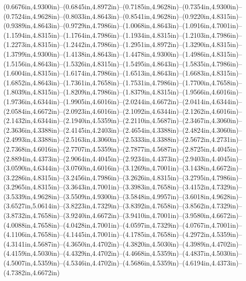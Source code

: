 (0.6676in,4.9300in)--(0.6845in,4.8972in)--(0.7185in,4.9628in)--(0.7354in,4.9300in)--(0.7524in,4.9628in)--(0.8033in,4.8643in)--(0.8541in,4.9628in)--(0.9220in,4.8315in)--(0.9389in,4.8643in)--(0.9729in,4.7986in)--(1.0068in,4.8643in)--(1.0916in,4.7001in)--(1.1594in,4.8315in)--(1.1764in,4.7986in)--(1.1934in,4.8315in)--(1.2103in,4.7986in)--(1.2273in,4.8315in)--(1.2442in,4.7986in)--(1.2951in,4.8972in)--(1.3290in,4.8315in)--(1.3799in,4.9300in)--(1.4138in,4.8643in)--(1.4478in,4.9300in)--(1.4986in,4.8315in)--(1.5156in,4.8643in)--(1.5326in,4.8315in)--(1.5495in,4.8643in)--(1.5835in,4.7986in)--(1.6004in,4.8315in)--(1.6174in,4.7986in)--(1.6513in,4.8643in)--(1.6683in,4.8315in)--(1.6852in,4.8643in)--(1.7361in,4.7658in)--(1.7531in,4.7986in)--(1.7700in,4.7658in)--(1.8039in,4.8315in)--(1.8209in,4.7986in)--(1.8379in,4.8315in)--(1.9566in,4.6016in)--(1.9736in,4.6344in)--(1.9905in,4.6016in)--(2.0244in,4.6672in)--(2.0414in,4.6344in)--(2.0584in,4.6672in)--(2.0923in,4.6016in)--(2.1092in,4.6344in)--(2.1262in,4.6016in)--(2.1432in,4.6344in)--(2.1940in,4.5359in)--(2.2110in,4.5687in)--(2.3467in,4.3060in)--(2.3636in,4.3388in)--(2.4145in,4.2403in)--(2.4654in,4.3388in)--(2.4824in,4.3060in)--(2.4993in,4.3388in)--(2.5163in,4.3060in)--(2.5333in,4.3388in)--(2.5672in,4.2731in)--(2.7368in,4.6016in)--(2.7707in,4.5359in)--(2.7877in,4.5687in)--(2.8725in,4.4045in)--(2.8894in,4.4373in)--(2.9064in,4.4045in)--(2.9234in,4.4373in)--(2.9403in,4.4045in)--(3.0590in,4.6344in)--(3.0760in,4.6016in)--(3.1269in,4.7001in)--(3.1438in,4.6672in)--(3.2286in,4.8315in)--(3.2456in,4.7986in)--(3.2626in,4.8315in)--(3.2795in,4.7986in)--(3.2965in,4.8315in)--(3.3643in,4.7001in)--(3.3983in,4.7658in)--(3.4152in,4.7329in)--(3.5339in,4.9628in)--(3.5509in,4.9300in)--(3.5848in,4.9957in)--(3.6018in,4.9628in)--(3.6527in,5.0614in)--(3.8223in,4.7329in)--(3.8392in,4.7658in)--(3.8562in,4.7329in)--(3.8732in,4.7658in)--(3.9240in,4.6672in)--(3.9410in,4.7001in)--(3.9580in,4.6672in)--(4.0088in,4.7658in)--(4.0428in,4.7001in)--(4.0597in,4.7329in)--(4.0767in,4.7001in)--(4.1106in,4.7658in)--(4.1445in,4.7001in)--(4.1785in,4.7658in)--(4.2972in,4.5359in)--(4.3141in,4.5687in)--(4.3650in,4.4702in)--(4.3820in,4.5030in)--(4.3989in,4.4702in)--(4.4159in,4.5030in)--(4.4329in,4.4702in)--(4.4668in,4.5359in)--(4.4837in,4.5030in)--(4.5007in,4.5359in)--(4.5346in,4.4702in)--(4.5686in,4.5359in)--(4.6194in,4.4373in)--(4.7382in,4.6672in) 